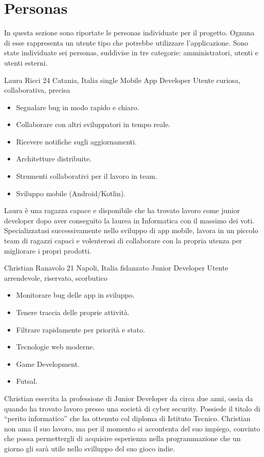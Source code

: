 \section{Personas}
In questa sezione sono riportate le personas individuate per il progetto.
Ognuna di esse rappresenta un utente tipo che potrebbe utilizzare l'applicazione.
Sono state individuate sei personas, suddivise in tre categorie: amministratori, utenti e utenti esterni.

\begin{personaenv}
  {Laura Ricci}
  {24}
  {Catania, Italia}
  {single}
  {Mobile App Developer}
  {Utente}
  {curiosa, collaborativa, precisa}
  {\begin{itemize}
    \item Segnalare bug in modo rapido e chiaro.
    \item Collaborare con altri sviluppatori in tempo reale.
    \item Ricevere notifiche sugli aggiornamenti.
  \end{itemize}}
  {\begin{itemize}
    \item Architetture distribuite.
    \item Strumenti collaborativi per il lavoro in team.
    \item Sviluppo mobile (Android/Kotlin).
  \end{itemize}}
  {Laura è una ragazza capace e disponibile che ha trovato lavoro come junior developer dopo aver conseguito
  la laurea in Informatica con il massimo dei voti. Specializzatasi successivamente nello sviluppo di app mobile,
  lavora in un piccolo team di ragazzi capaci e volenterosi di collaborare con la propria utenza per migliorare
  i propri prodotti.}
\end{personaenv}

\begin{personaenv}
  {Christian Ranavolo}
  {21}
  {Napoli, Italia}
  {fidanzato}
  {Junior Developer}
  {Utente}
  {arrendevole, riservato, scorbutico}
  {\begin{itemize}
    \item Monitorare bug delle app in sviluppo.
    \item Tenere traccia delle proprie attività.
    \item Filtrare rapidamente per priorità e stato.
  \end{itemize}}
  {\begin{itemize}
    \item Tecnologie web moderne.
    \item Game Development.
    \item Futsal.
  \end{itemize}}
  {Christian esercita la professione di Junior Developer da circa due anni, ossia da quando ha trovato lavoro presso 
  una società di cyber security. Possiede il titolo di “perito informatico” che ha ottenuto col diploma di Istituto Tecnico. 
  Christian non ama il suo lavoro, ma per il momento si accontenta del suo impiego, convinto che possa permettergli di 
  acquisire esperienza nella programmazione che un giorno gli sarà utile nello svilluppo del suo gioco indie.}
\end{personaenv}

